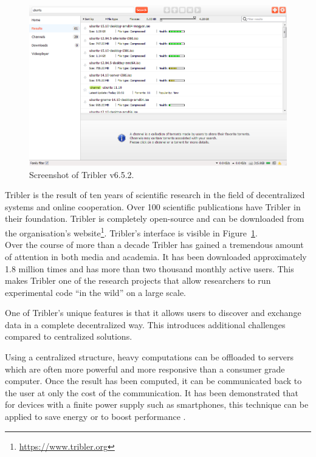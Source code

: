 \begin{figure}[!h]
	\centering
	\includegraphics[width=\linewidth]{introduction/images/tribler_screenshot.png}
	\caption{Screenshot of Tribler v6.5.2.}
	\label{fig:tribler_screenshot}
\end{figure}

Tribler is the result of ten years of scientific research in the field of decentralized systems and online cooperation.
Over 100 scientific publications have Tribler in their foundation.
Tribler is completely open-source and can be downloaded from the organisation's website\footnote{\url{https://www.tribler.org}}.
Tribler's interface is visible in Figure~\ref{fig:tribler_screenshot}.\\
Over the course of more than a decade Tribler has gained a tremendous amount of attention in both media and academia.
It has been downloaded approximately 1.8 million times \cite{github2016releases} and has more than two thousand monthly active users.
This makes Tribler one of the research projects that allow researchers to run experimental code \enquote{in the wild} on a large scale.

One of Tribler's unique features is that it allows users to discover and exchange data in a complete decentralized way.
This introduces additional challenges compared to centralized solutions.

Using a centralized structure, heavy computations can be offloaded to servers which are often more powerful and more responsive than a consumer grade computer.
Once the result has been computed, it can be communicated back to the user at only the cost of the communication. 
It has been demonstrated that for devices with a finite power supply such as smartphones, this technique can be applied to save energy or to boost performance \cite{kumar2010cloud, kemp2010cuckoo}.

